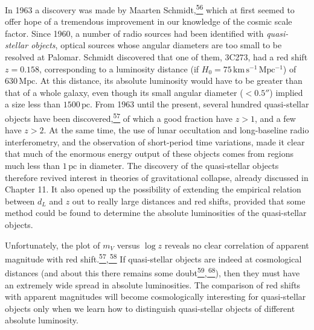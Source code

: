 In 1963 a discovery was made by Maarten
Schmidt,\hyperref[ch14-ref-56]{\textsuperscript{56}} which at first seemed
to offer hope of a tremendous improvement in our knowledge of the cosmic
scale factor. Since 1960, a number of radio sources had been identified with
\emph{quasi-stellar objects}, optical sources whose angular diameters are
too small to be resolved at Palomar. Schmidt discovered that one of them,
3C273, had a red shift \(z=0.158\), corresponding to a luminosity distance
(if \(H_0=75\,\mathrm{km\,s^{-1}\,Mpc^{-1}}\)) of
\(630\,\mathrm{Mpc}\). At this distance, its absolute luminosity would have
to be greater than that of a whole galaxy, even though its small angular
diameter (\(<0.5''\)) implied a size less than \(1500\,\mathrm{pc}\). From
1963 until the present, several hundred quasi-stellar objects have been
discovered,\hyperref[ch14-ref-57]{\textsuperscript{57}} of which a good
fraction have \(z>1\), and a few have \(z>2\). At the same time, the use of
lunar occultation and long-baseline radio interferometry, and the
observation of short-period time variations, made it clear that much of the
enormous energy output of these objects comes from regions much less than
\(1\,\mathrm{pc}\) in diameter. The discovery of the quasi-stellar objects
therefore revived interest in theories of gravitational collapse, already
discussed in Chapter 11. It also opened up the possibility of extending the
empirical relation between \(d_L\) and \(z\) out to really large distances
and red shifts, provided that some method could be found to determine the
absolute luminosities of the quasi-stellar objects.

Unfortunately, the plot of \(m_V\) versus \(\log z\) reveals no clear
correlation of apparent magnitude with red
shift.\hyperref[ch14-ref-57]{\textsuperscript{57},\,\textsuperscript{58}}
If quasi-stellar objects are indeed at cosmological distances (and about this
there remains some
doubt\hyperref[ch14-ref-59]{\textsuperscript{59},\,\textsuperscript{68}}),
then they must have an extremely wide spread in absolute luminosities. The
comparison of red shifts with apparent magnitudes will become
cosmologically interesting for quasi-stellar objects only when we learn how
to distinguish quasi-stellar objects of different absolute luminosity.

